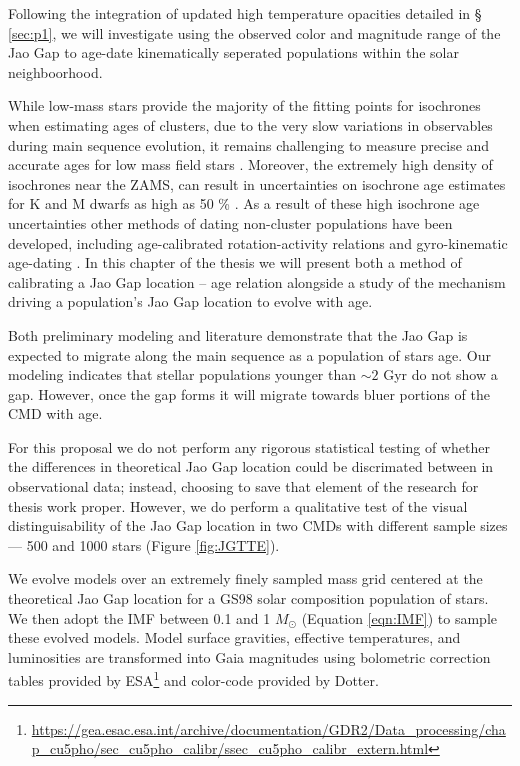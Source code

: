 Following the integration of updated high temperature opacities detailed in \S
\ref{sec:p1}, we will investigate using the observed color and magnitude range
of the Jao Gap to age-date kinematically seperated populations within the solar
neighboorhood.

While low-mass stars provide the majority of the fitting points for isochrones
when estimating ages of clusters, due to the very slow variations in
observables during main sequence evolution, it remains challenging to measure
precise and accurate ages for low mass field stars \citep{Soderblom2010,
Veyette2018, Kiman2021}. Moreover, the extremely high density of isochrones
near the ZAMS, can result in uncertainties on isochrone age estimates for K
and M dwarfs as high as 50 \% \citep{Lu2021}. As a result of these high
isochrone age uncertainties other methods of dating non-cluster populations
have been developed, including age-calibrated rotation-activity relations
\citep[e.g.][]{Kiman2021} and gyro-kinematic age-dating \citep[e.g.][]{Lu2021}.
In this chapter of the thesis we will present both a method of calibrating a
Jao Gap location -- age relation alongside a study of the mechanism driving a
population's Jao Gap location to evolve with age.

Both preliminary modeling and literature
\citep[e.g.][]{Jao2018,Jao2020,Feiden2021,Mansfield2021} demonstrate that the
Jao Gap is expected to migrate along the main sequence as a population of stars
age. Our modeling indicates that stellar populations younger than $\sim 2$ Gyr
do not show a gap. However, once the gap forms it will migrate towards bluer
portions of the CMD with age.

For this proposal we do not perform any rigorous statistical testing of whether
the differences in theoretical Jao Gap location could be discrimated between in
observational data; instead, choosing to save that element of the research for
thesis work proper. However, we do perform a qualitative test of the visual
distinguisability of the Jao Gap location in two CMDs with different sample
sizes --- 500 and 1000 stars (Figure \ref{fig:JGTTE}).

We evolve models over an extremely finely sampled mass grid centered at the
theoretical Jao Gap location for a GS98 solar composition population of stars.
We then adopt the \citep{Sollima2019} IMF between 0.1 and 1 $M_{\odot}$
(Equation \ref{eqn:IMF}) to sample these evolved models. Model surface
gravities, effective temperatures, and luminosities are transformed into Gaia
magnitudes using bolometric correction tables provided by
ESA\footnote{\url{https://gea.esac.esa.int/archive/documentation/GDR2/Data\_processing/chap\_cu5pho/sec\_cu5pho\_calibr/ssec\_cu5pho\_calibr\_extern.html}}
and color-code provided by Dotter. 

